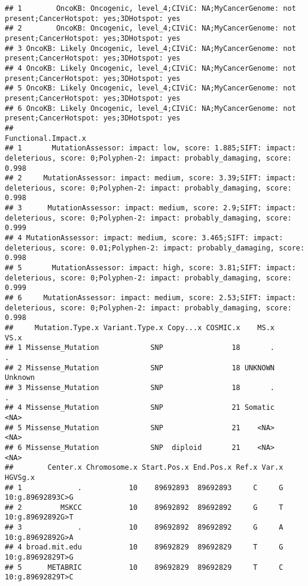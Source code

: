 \documentclass[
]{article}
\begin{document}
\begin{verbatim}
## 1        OncoKB: Oncogenic, level_4;CIViC: NA;MyCancerGenome: not present;CancerHotspot: yes;3DHotspot: yes
## 2        OncoKB: Oncogenic, level_4;CIViC: NA;MyCancerGenome: not present;CancerHotspot: yes;3DHotspot: yes
## 3 OncoKB: Likely Oncogenic, level_4;CIViC: NA;MyCancerGenome: not present;CancerHotspot: yes;3DHotspot: yes
## 4 OncoKB: Likely Oncogenic, level_4;CIViC: NA;MyCancerGenome: not present;CancerHotspot: yes;3DHotspot: yes
## 5 OncoKB: Likely Oncogenic, level_4;CIViC: NA;MyCancerGenome: not present;CancerHotspot: yes;3DHotspot: yes
## 6 OncoKB: Likely Oncogenic, level_4;CIViC: NA;MyCancerGenome: not present;CancerHotspot: yes;3DHotspot: yes
##                                                                                                                         Functional.Impact.x
## 1       MutationAssessor: impact: low, score: 1.885;SIFT: impact: deleterious, score: 0;Polyphen-2: impact: probably_damaging, score: 0.998
## 2     MutationAssessor: impact: medium, score: 3.39;SIFT: impact: deleterious, score: 0;Polyphen-2: impact: probably_damaging, score: 0.998
## 3      MutationAssessor: impact: medium, score: 2.9;SIFT: impact: deleterious, score: 0;Polyphen-2: impact: probably_damaging, score: 0.999
## 4 MutationAssessor: impact: medium, score: 3.465;SIFT: impact: deleterious, score: 0.01;Polyphen-2: impact: probably_damaging, score: 0.998
## 5       MutationAssessor: impact: high, score: 3.81;SIFT: impact: deleterious, score: 0;Polyphen-2: impact: probably_damaging, score: 0.999
## 6     MutationAssessor: impact: medium, score: 2.53;SIFT: impact: deleterious, score: 0;Polyphen-2: impact: probably_damaging, score: 0.998
##     Mutation.Type.x Variant.Type.x Copy...x COSMIC.x    MS.x    VS.x
## 1 Missense_Mutation            SNP                18       .       .
## 2 Missense_Mutation            SNP                18 UNKNOWN Unknown
## 3 Missense_Mutation            SNP                18       .       .
## 4 Missense_Mutation            SNP                21 Somatic    <NA>
## 5 Missense_Mutation            SNP                21    <NA>    <NA>
## 6 Missense_Mutation            SNP  diploid       21    <NA>    <NA>
##        Center.x Chromosome.x Start.Pos.x End.Pos.x Ref.x Var.x          HGVSg.x
## 1             .           10    89692893  89692893     C     G 10:g.89692893C>G
## 2         MSKCC           10    89692892  89692892     G     T 10:g.89692892G>T
## 3             .           10    89692892  89692892     G     A 10:g.89692892G>A
## 4 broad.mit.edu           10    89692829  89692829     T     G 10:g.89692829T>G
## 5      METABRIC           10    89692829  89692829     T     C 10:g.89692829T>C

\end{verbatim}
\end{document}
